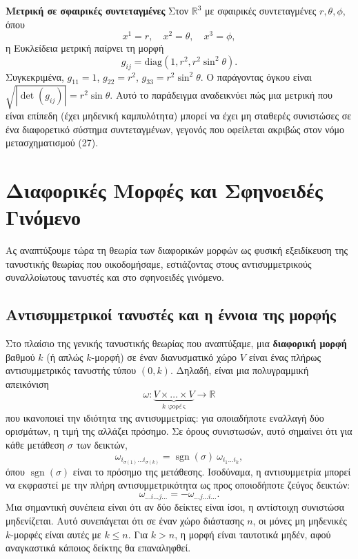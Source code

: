 \documentclass[12pt]{article}
\begin{document}
\textbf{Μετρική σε σφαιρικές συντεταγμένες}  
Στον \( \mathbb{R}^3 \) με σφαιρικές συντεταγμένες \( r, \theta, \phi \), όπου
\begin{equation}
x^1 = r, \quad x^2 = \theta, \quad x^3 = \phi,
\end{equation}
η Ευκλείδεια μετρική παίρνει τη μορφή
\begin{equation}
g_{ij} = \text{diag}(1, r^2, r^2 \sin^2\theta). \tag{36}
\end{equation}
Συγκεκριμένα, \( g_{11} = 1 \), \( g_{22} = r^2 \), \( g_{33} = r^2 \sin^2\theta \). Ο παράγοντας όγκου είναι \( \sqrt{|\det(g_{ij})|} = r^2 \sin\theta \). Αυτό το παράδειγμα αναδεικνύει πώς μια μετρική που είναι επίπεδη (έχει μηδενική καμπυλότητα) μπορεί να έχει μη σταθερές συνιστώσες σε ένα διαφορετικό σύστημα συντεταγμένων, γεγονός που οφείλεται ακριβώς στον νόμο μετασχηματισμού (27).

\section{Διαφορικές Μορφές και Σφηνοειδές Γινόμενο}

Ας αναπτύξουμε τώρα τη θεωρία των διαφορικών μορφών ως φυσική εξειδίκευση της τανυστικής θεωρίας που οικοδομήσαμε, εστιάζοντας στους αντισυμμετρικούς συναλλοίωτους τανυστές και στο σφηνοειδές γινόμενο.

\subsection{Αντισυμμετρικοί τανυστές και η έννοια της μορφής}

Στο πλαίσιο της γενικής τανυστικής θεωρίας που αναπτύξαμε, μια \textbf{διαφορική μορφή} βαθμού \( k \) (ή απλώς \( k \)-μορφή) σε έναν διανυσματικό χώρο \( V \) είναι ένας πλήρως αντισυμμετρικός τανυστής τύπου \( (0,k) \). Δηλαδή, είναι μια πολυγραμμική απεικόνιση
\[
\omega: \underbrace{V \times \dots \times V}_{k \text{ φορές}} \to \mathbb{R}
\]
που ικανοποιεί την ιδιότητα της αντισυμμετρίας: για οποιαδήποτε εναλλαγή δύο ορισμάτων, η τιμή της αλλάζει πρόσημο. Σε όρους συνιστωσών, αυτό σημαίνει ότι για κάθε μετάθεση \( \sigma \) των δεικτών,
\[
\omega_{i_{\sigma(1)} \dots i_{\sigma(k)}} = \operatorname{sgn}(\sigma) \ \omega_{i_1 \dots i_k}, \tag{37}
\]
όπου \( \operatorname{sgn}(\sigma) \) είναι το πρόσημο της μετάθεσης. Ισοδύναμα, η αντισυμμετρία μπορεί να εκφραστεί με την πλήρη αντισυμμετρικότητα ως προς οποιοδήποτε ζεύγος δεικτών:
\[
\omega_{\dots i \dots j \dots} = - \omega_{\dots j \dots i \dots}. \tag{38}
\]
Μια σημαντική συνέπεια είναι ότι αν δύο δείκτες είναι ίσοι, η αντίστοιχη συνιστώσα μηδενίζεται. Αυτό συνεπάγεται ότι σε έναν χώρο διάστασης \( n \), οι μόνες μη μηδενικές \( k \)-μορφές είναι αυτές με \( k \le n \). Για \( k > n \), η μορφή είναι ταυτοτικά μηδέν, αφού αναγκαστικά κάποιος δείκτης θα επαναληφθεί.
\end{document}
